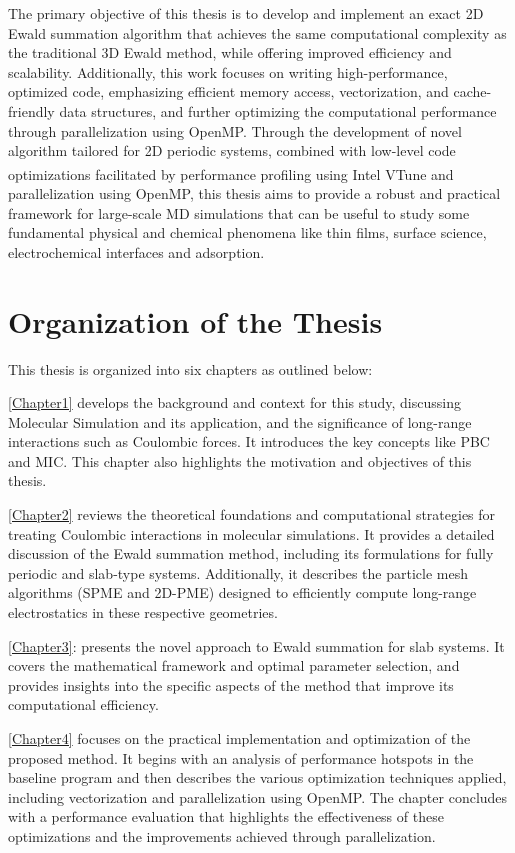 The primary objective of this thesis is to develop and implement an exact 2D Ewald summation algorithm that achieves the same computational complexity as the traditional 3D Ewald method, while offering improved efficiency and scalability. Additionally, this work focuses on writing high-performance, optimized code, emphasizing efficient memory access, vectorization, and cache-friendly data structures, and further optimizing the computational performance through parallelization using OpenMP. Through the development of novel algorithm tailored for 2D periodic systems, combined with low-level code optimizations facilitated by performance profiling using Intel\textsuperscript{\textregistered} VTune and parallelization using OpenMP, this thesis aims to provide a robust and practical framework for large-scale \acs{MD} simulations that can be useful to study some fundamental physical and chemical phenomena like thin films, surface science,  electrochemical interfaces and adsorption.

\section{Organization of the Thesis}
This thesis is organized into six chapters as outlined below:

\autoref{Chapter1} develops the background and context for this study, discussing Molecular Simulation and its application, and the significance of long-range interactions such as Coulombic forces. It introduces the key concepts like \ac{PBC} and \ac{MIC}. This chapter also highlights the motivation and objectives of this thesis.

\autoref{Chapter2} reviews the theoretical foundations and computational strategies for treating Coulombic interactions in molecular simulations. It provides a detailed discussion of the Ewald summation method, including its formulations for fully periodic and slab-type systems. Additionally, it describes the particle mesh algorithms (\acs{SPME} and \acs{2D-PME}) designed to efficiently compute long-range electrostatics in these respective geometries.

\autoref{Chapter3}: presents the novel approach to Ewald summation for slab systems. It covers the mathematical framework and optimal parameter selection, and provides insights into the specific aspects of the method that improve its computational efficiency. 

\autoref{Chapter4} focuses on the practical implementation and optimization of the proposed method. It begins with an analysis of performance hotspots in the baseline program and then describes the various optimization techniques applied, including vectorization and parallelization using OpenMP. The chapter concludes with a performance evaluation that highlights the effectiveness of these optimizations and the improvements achieved through parallelization.

